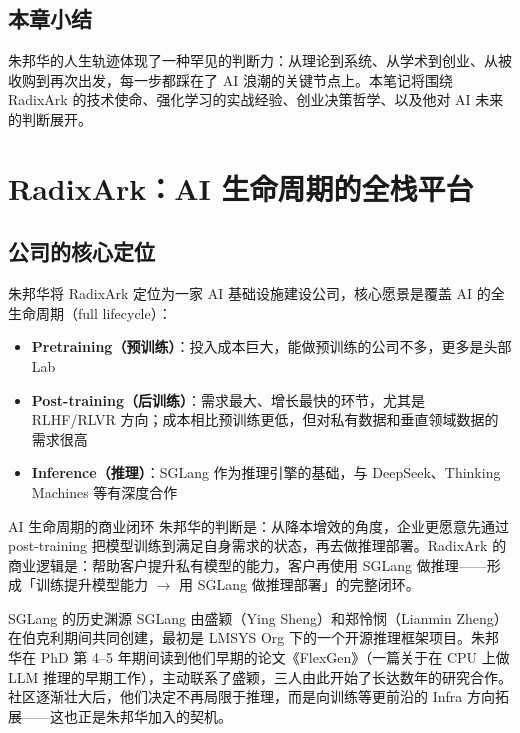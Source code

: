 \documentclass[a4paper]{article}
\begin{document}
\subsection{本章小结}
朱邦华的人生轨迹体现了一种罕见的判断力：从理论到系统、从学术到创业、从被收购到再次出发，每一步都踩在了 AI 浪潮的关键节点上。本笔记将围绕 RadixArk 的技术使命、强化学习的实战经验、创业决策哲学、以及他对 AI 未来的判断展开。

\section{RadixArk：AI 生命周期的全栈平台}

\subsection{公司的核心定位}

朱邦华将 RadixArk 定位为一家 AI 基础设施建设公司，核心愿景是覆盖 AI 的全生命周期（full lifecycle）：

\begin{itemize}
\item \textbf{Pretraining（预训练）}：投入成本巨大，能做预训练的公司不多，更多是头部 Lab
\item \textbf{Post-training（后训练）}：需求最大、增长最快的环节，尤其是 RLHF/RLVR 方向；成本相比预训练更低，但对私有数据和垂直领域数据的需求很高
\item \textbf{Inference（推理）}：SGLang 作为推理引擎的基础，与 DeepSeek、Thinking Machines 等有深度合作
\end{itemize}

\begin{importantbox}{AI 生命周期的商业闭环}
朱邦华的判断是：从降本增效的角度，企业更愿意先通过 post-training 把模型训练到满足自身需求的状态，再去做推理部署。RadixArk 的商业逻辑是：帮助客户提升私有模型的能力，客户再使用 SGLang 做推理——形成「训练提升模型能力 $\rightarrow$ 用 SGLang 做推理部署」的完整闭环。
\end{importantbox}

\begin{knowledgebox}{SGLang 的历史渊源}
SGLang 由盛颖（Ying Sheng）和郑怜悯（Lianmin Zheng）在伯克利期间共同创建，最初是 LMSYS Org 下的一个开源推理框架项目。朱邦华在 PhD 第 4--5 年期间读到他们早期的论文《FlexGen》（一篇关于在 CPU 上做 LLM 推理的早期工作），主动联系了盛颖，三人由此开始了长达数年的研究合作。社区逐渐壮大后，他们决定不再局限于推理，而是向训练等更前沿的 Infra 方向拓展——这也正是朱邦华加入的契机。
\end{knowledgebox}
\end{document}
